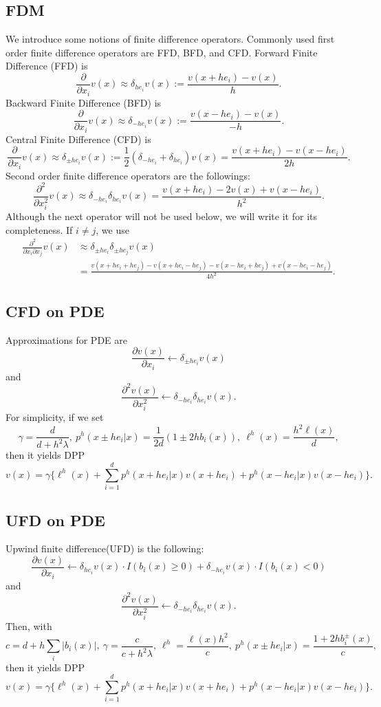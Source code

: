 \documentclass[11pt]{amsart}
\begin{document}
\subsection{FDM}
We introduce some notions of finite difference operators.
Commonly used first order finite difference operators 
are FFD, BFD, and CFD. 
Forward Finite Difference (FFD) is
$$\frac{\partial}{\partial x_{i}}v(x) \approx \delta_{he_{i}} v(x) 
:= \frac{v(x+he_{i}) - v(x)}{h}.$$
Backward Finite Difference (BFD) is
$$\frac{\partial}{\partial x_{i}}v(x) \approx \delta_{-he_{i}} v(x) 
:= \frac{v(x-he_{i}) - v(x)}{-h}.$$
Central Finite Difference (CFD) is
$$\frac{\partial}{\partial x_{i}}v(x) \approx 
\delta_{\pm h e_{i}} v(x)
:= \frac 1 2 (\delta_{-he_{i}} + \delta_{he_{i}}) v(x)
= \frac{v(x+he_{i}) - v(x-he_{i})}{2h}.$$
Second order finite difference operators are the followings:
$$
\frac{\partial^{2}}{\partial x_{i}^{2}} v(x)
\approx
\delta_{-he_{i}} \delta_{he_{i}} v(x)
= \frac{v(x+he_{i}) - 2 v(x) + v(x- he_{i})}{h^{2}}.
$$
Although the next operator will not be used below, we will write it for its completeness. If $i \neq j$, we use
$$
\begin{array}
 {ll}
\frac{\partial^{2}}{\partial x_{i} \partial x_{j}} v(x) &\approx
\delta_{\pm he_{i}} \delta_{\pm he_{j}} v(x)
\\ 
& \displaystyle
= \frac{v(x+he_{i}+he_{j}) - v(x+he_{i}-he_{j})
- v(x-he_{i}+he_{j})+ v(x-he_{i}-he_{j})}{4h^{2}}. 
\end{array}
$$


\subsection{CFD on PDE}
Approximations for PDE are 
$$
\frac{\partial v(x)}{\partial x_i} \leftarrow 
\delta_{\pm h e_{i}} v(x)
$$
and
$$
\frac{\partial^2 v(x)}{\partial x_i^2} \leftarrow
\delta_{-he_{i}} \delta_{he_{i}} v(x).$$
For simplicity, if we set 
$$
\gamma = \frac{d}{d+ h^{2} \lambda}, \
p^{h}(x \pm he_{i}|x) = \frac 1 {2d} (1 \pm 2h b_{i}(x)), \
\ell^{h}(x) = \frac{h^{2} \ell(x)}{d},
$$
then it yields DPP
$$
v (x) = \gamma 
\Big\{ \ell^{h}(x) + 
\sum_{i=1}^{d} 
p^{h}(x+he_{i}|x) v(x+he_{i})
+ p^{h}(x-he_{i}|x) v(x-he_{i})
\Big\}.
$$

\subsection{UFD on PDE}
Upwind finite difference(UFD) is the following:
$$
\frac{\partial v(x)}{\partial x_i} \leftarrow 
\delta_{ h e_{i}} v(x) \cdot I(b_{i}(x)\ge 0) +
\delta_{-he_{i}} v(x) \cdot I(b_{i}(x) <0)
$$
and
$$
\frac{\partial^2 v(x)}{\partial x_i^2} \leftarrow
\delta_{-he_{i}} \delta_{he_{i}} v(x).$$
Then, with
$$c = d+h\sum_{i} |b_{i}(x)|, \ 
\gamma = \frac{c}{c+h^{2}\lambda}, \ 
\ell^{h} = \frac{\ell(x) h^{2}}{c}, \ 
p^{h}(x \pm he_{i}|x) = \frac{1+ 2hb_{i}^{\pm}(x)}{c},
$$
then it yields DPP
$$
v (x) = \gamma 
\Big\{ \ell^{h}(x) + 
\sum_{i=1}^{d} 
p^{h}(x+he_{i}|x) v(x+he_{i})
+ p^{h}(x-he_{i}|x) v(x-he_{i})
\Big\}.
$$
\end{document}
